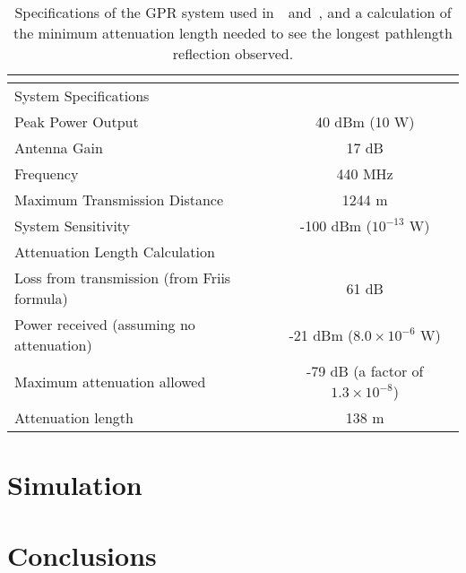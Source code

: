 \documentclass{elsart}
\begin{document}
\begin{table}
  \begin{center}
    \begin{tabular}{lc}
      \multicolumn{2}{c}{} \\ \hline\hline
      System Specifications &\\\hline
      Peak Power Output & 40 dBm (10 W)\\
      Antenna Gain & 17 dB\\
      Frequency & 440 MHz\\
      Maximum Transmission Distance & 1244 m\\
      System Sensitivity & -100 dBm ($10^{-13}$ W)\\\hline\hline
      Attenuation Length Calculation & \\\hline
      Loss from transmission (from Friis formula) & 61 dB\\
      Power received (assuming no attenuation) & -21 dBm ($8.0\times 10^{-6}$ W)\\
      Maximum attenuation allowed & -79 dB (a factor of $1.3\times 10^{-8}$)\\
      Attenuation length & 138 m\\\hline
    \end{tabular}
  \end{center}
  \caption{Specifications of the GPR system used in~\cite{s-unterberger}~and~\cite{unterberger}, 
    and a calculation of the minimum attenuation length needed to see the longest pathlength 
    reflection observed.}
  \label{tab:gprspecs}
\end{table}



\section{Simulation}


\section{Conclusions}


  

\end{document}
